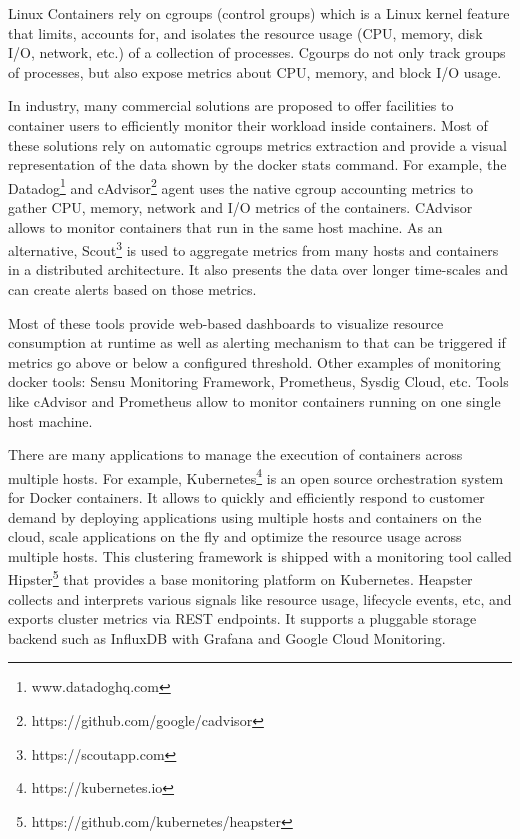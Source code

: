 Linux Containers rely on cgroups (control groups) which is a Linux kernel feature that limits, accounts for, and isolates the resource usage (CPU, memory, disk I/O, network, etc.) of a collection of processes.
Cgourps do not only track groups of processes, but also expose metrics about CPU, memory, and block I/O usage. 

In industry, many commercial solutions are proposed to offer facilities to container users to efficiently monitor their workload inside containers. Most of these solutions rely on automatic cgroups metrics extraction and provide a visual representation of the data shown by the docker stats command. For example, the Datadog\footnote{www.datadoghq.com} and cAdvisor\footnote{https://github.com/google/cadvisor} agent uses the native cgroup accounting metrics to gather CPU, memory, network and I/O metrics of the containers. CAdvisor allows to monitor containers that run in the same host machine. As an alternative, Scout\footnote{https://scoutapp.com} is used to aggregate metrics from many hosts and containers in a distributed architecture. It also presents the data over longer time-scales and can create alerts based on those metrics. 

Most of these tools provide web-based dashboards to visualize resource consumption at runtime as well as alerting mechanism to that can be triggered if metrics go above or below a configured threshold. Other examples of monitoring docker tools: Sensu Monitoring Framework, Prometheus, Sysdig Cloud, etc.
Tools like cAdvisor and Prometheus allow to monitor containers running on one single host machine. 

There are many applications to manage the execution of containers across multiple hosts. For example, Kubernetes\footnote{https://kubernetes.io} is an open source orchestration system for Docker containers. It allows to quickly and efficiently respond to customer demand by deploying applications using multiple hosts and containers on the cloud, scale applications on the fly and optimize the resource usage across multiple hosts. This clustering framework is shipped with a monitoring tool called Hipster\footnote{https://github.com/kubernetes/heapster} that provides a base monitoring platform on Kubernetes. Heapster collects and interprets various signals like resource usage, lifecycle events, etc, and exports cluster metrics via REST endpoints. It supports a pluggable storage backend such as InfluxDB with Grafana and Google Cloud Monitoring.


